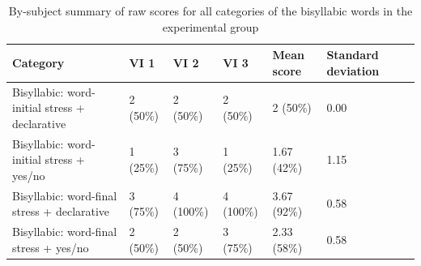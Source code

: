 \documentclass[a4paper]{article}
\begin{document}
\begin{table}[H]
  \begin{center}
    \caption{By-subject summary of raw scores for all categories of the bisyllabic words in the experimental group}
    \label{tab:table10}
      \begin{tabular}{|p{2cm}|p{2cm}|p{2cm}|p{2cm}|p{2cm}|p{2cm}|p{2cm}}
            \hline
         Category  & VI 1 & VI 2 & VI 3 & Mean score & Standard deviation  \\
      \hline
     Bisyllabic: word-initial stress + declarative & 2 (50\%)&  2 (50\%) &  2 (50\%) & 2 (50\%) & 0.00 \\
      \hline
     Bisyllabic: word-initial stress + yes/no & 1 (25\%) & 3 (75\%)  & 1 (25\%) & 1.67 (42\%) & 1.15 \\
      \hline
     Bisyllabic: word-final stress + declarative & 3 (75\%) & 4 (100\%) & 4 (100\%) & 3.67 (92\%) & 0.58\\
           \hline
     Bisyllabic: word-final stress + yes/no &  2 (50\%) &  2 (50\%) & 3 (75\%) & 2.33 (58\%) & 0.58 \\
     
     \hline
    \end{tabular}
  \end{center}
\end{table}
\end{document}
